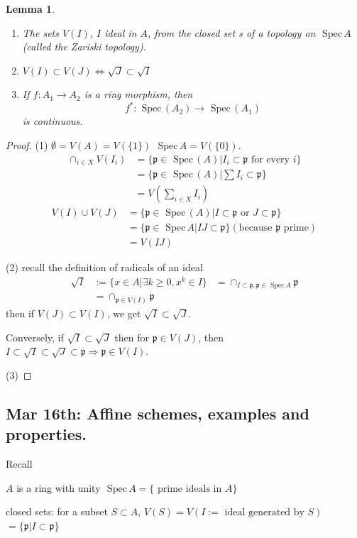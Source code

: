\documentclass[11pt]{article}
\newtheorem{lemma}[thm]{Lemma}
\newcommand{\spec}{\text{ Spec}\,}
\newcommand{\scp}{{\mathfrak p}}
\newcommand{\Lrta}{\Longrightarrow}
\newcommand{\lrta}{\longrightarrow}
\newcommand{\Llrta}{\Longleftrightarrow}
\begin{document}
\begin{lemma}\ 
\begin{enumerate}[label=(\arabic*)]
\item The sets $V(I)$, $I$ ideal in $A$, from  the closed set s of a topology on $\spec A$ (called the Zariski topology).
\item $V(I)\subset V(J)\Llrta \sqrt{J}\subset \sqrt{I}$
\item If $f: A_1\lrta A_2$ is a ring morphism, then 
$$
f^*:\spec(A_2)\lrta \spec(A_1)
$$
is continuous.
\end{enumerate}
\end{lemma}
\begin{proof}
(1) $\emptyset =V(A)=V(\{1\})$ $\spec A=V(\{0\})$.
$$
\begin{aligned}
\cap_{i\in X}V(I_i)&=\{\scp\in \spec(A)|I_i\subset \scp\text{ for every $i$}\}\\
&=\{\scp\in \spec(A)|\sum I_i\subset \scp\}\\
&= V\left(\sum_{i\in X}I_i\right)
\end{aligned}
$$
$$
\begin{aligned}
V(I)\cup V(J)&=\{\scp\in\spec (A)|I\subset \scp\text{  or } J\subset \scp\}\\
&=\{\scp\in\spec A|I J\subset \scp\}(\text{because $\scp$ prime})\\
&=V(IJ)
\end{aligned}
$$

(2) recall the definition of radicals of an ideal 
$$
\begin{aligned}
\sqrt{I}&:=\{x\in A|\exists k\geq 0, x^k\in I\}
&=\cap_{I\subset \scp,\scp\in\spec A}\scp\\
&=\cap_{\scp \in V(I)}\scp
\end{aligned}
$$
then if $V(J)\subset V(I)$, we get $\sqrt{I}\subset \sqrt{J}$.

Conversely, if $\sqrt{I}\subset \sqrt{J}$ then for $\scp\in V(J)$, then
$I\subset \sqrt{I}\subset\sqrt{J}\subset \scp\Lrta \scp\in V(I)$.

(3)
\end{proof}

\subsection{Mar 16th: Affine schemes, examples and properties.}
Recall

$A$ is a ring with unity
$\spec A=\{\text{ prime ideals in $A$}\}$

closed sets: for a subset $S\subset A$,
$V(S)=V(I:=\text{ ideal generated by $S$})$ $=\{\scp|I\subset \scp\}$
\end{document}
